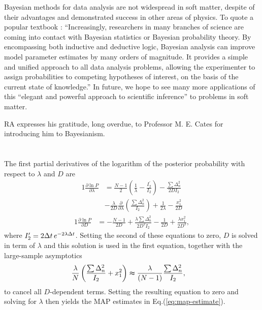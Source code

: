 \documentclass[english,aps, twocolumn, pre,superscriptaddress]{revtex4-1}
\begin{document}
Bayesian methods for data analysis are not widespread in soft matter,
despite of their advantages and demonstrated success in other areas
of physics. To quote a popular textbook \cite{gregory2005bayesian}:
``Increasingly, researchers in many branches of science are coming
into contact with Bayesian statistics or Bayesian probability theory.
By encompassing both inductive and deductive logic, Bayesian analysis
can improve model parameter estimates by many orders of magnitude.
It provides a simple and unified approach to all data analysis problems,
allowing the experimenter to assign probabilities to competing hypotheses
of interest, on the basis of the current state of knowledge.'' In
future, we hope to see many more applications of this ``elegant and
powerful approach to scientific inference''\cite{gregory2005bayesian}
to problems in soft matter. 
\begin{acknowledgments}
RA expresses his gratitude, long overdue, to Professor M. E. Cates
for introducing him to Bayesianism.
\end{acknowledgments}

\appendix
\section{}

The first partial derivatives of the logarithm of the posterior probability
with respect to $\lambda$ and $D$ are
\begin{alignat*}{1}
\frac{\partial\ln P}{\partial\lambda} & =\frac{N-1}{2}\left(\frac{1}{\lambda}-\frac{I_{2}^{\prime}}{I_{2}}\right)-\frac{\sum\Delta_{n}^{2}}{2DI_{2}}\\
 & -\frac{\lambda}{2D}\frac{\partial}{\partial\lambda}\left(\frac{\sum\Delta_{n}^{2}}{I_{2}}\right)+\frac{1}{2\lambda}-\frac{x_{1}^{2}}{2D}
\end{alignat*}
\begin{alignat*}{1}
\frac{\partial\ln P}{\partial D} & =-\frac{N-1}{2D}+\frac{\lambda\sum\Delta_{n}^{2}}{2D^{2}I_{2}}-\frac{1}{2D}+\frac{\lambda x_{1}^{2}}{2D^{2}},
\end{alignat*}
where $I_{2}^{\prime}=2\Delta t\thinspace e^{-2\lambda\Delta t}$.
Setting the second of these equations to zero, $D$ is solved in term
of $\lambda$ and this solution is used in the first equation, together
with the large-sample asymptotics
\begin{alignat*}{1}
\frac{\lambda}{N}\left(\frac{\sum\Delta_{n}^{2}}{I_{2}}+x_{1}^{2}\right) & \thickapprox\frac{\lambda}{\left(N-1\right)}\frac{\sum\Delta_{n}^{2}}{I_{2}},
\end{alignat*}
to cancel all $D$-dependent terms. Setting the resulting equation
to zero and solving for $\lambda$ then yields the MAP estimates in
Eq.(\ref{eq:map-estimate}). 
\end{document}

